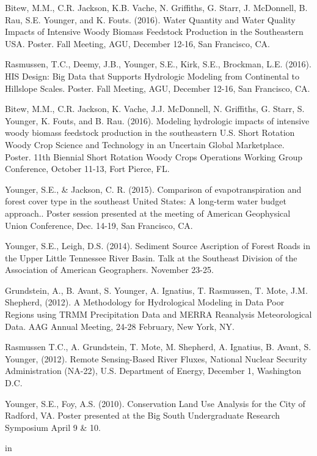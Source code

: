 \documentclass[10pt,letterpaper]{article}
\begin{document}
\begin{hangparas}{.25in}{1}
	Bitew, M.M., C.R. Jackson, K.B. Vache, N. Griffiths, G. Starr, J. McDonnell, B. Rau, S.E. Younger, and K. Fouts. (2016). Water Quantity and Water Quality Impacts of Intensive Woody Biomass Feedstock Production in the Southeastern USA. Poster. Fall Meeting, AGU, December 12-16, San Francisco, CA. 
	
	Rasmussen, T.C., Deemy, J.B., Younger, S.E., Kirk, S.E., Brockman, L.E. (2016). HIS Design: Big Data that Supports Hydrologic Modeling from Continental to Hillslope Scales. Poster. Fall Meeting, AGU, December 12-16, San Francisco, CA. 
	
	Bitew, M.M., C.R. Jackson, K. Vache, J.J. McDonnell, N. Griffiths, G. Starr, S. Younger, K. Fouts, and B. Rau. (2016). Modeling hydrologic impacts of intensive woody biomass feedstock production in the southeastern U.S. Short Rotation Woody Crop Science and Technology in an Uncertain Global Marketplace. Poster. 11th Biennial Short Rotation Woody Crops Operations Working Group Conference, October 11-13, Fort Pierce, FL.
	
	Younger, S.E., \& Jackson, C. R. (2015). Comparison of evapotranspiration and forest cover type in the southeast United States: A long-term water budget approach.. Poster session presented at the meeting of American Geophysical Union Conference, Dec. 14-19, San Francisco, CA.
	
	Younger, S.E., Leigh, D.S. (2014). Sediment Source Ascription of Forest Roads in the Upper Little Tennessee River Basin. Talk at the Southeast Division of the Association of American Geographers. November 23-25.
	
	Grundstein, A., B. Avant, S. Younger, A. Ignatius, T. Rasmussen, T. Mote, J.M. Shepherd, (2012). A Methodology for Hydrological Modeling in Data Poor Regions using TRMM Precipitation Data and MERRA Reanalysis Meteorological Data. AAG Annual Meeting, 24-28 February, New York, NY.
	
	Rasmussen T.C., A. Grundstein, T. Mote, M. Shepherd, A. Ignatius, B. Avant, S. Younger, (2012). Remote Sensing-Based River Fluxes, National Nuclear Security Administration (NA-22), U.S. Department of Energy, December 1, Washington D.C.
	
	Younger, S.E., Foy, A.S. (2010). Conservation Land Use Analysis for the City of Radford, VA. Poster presented at the Big South Undergraduate Research Symposium April 9 \& 10.
	
\end{hangparas}

 in
\end{document}
